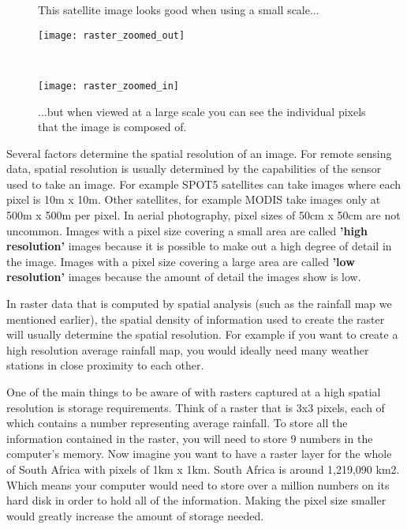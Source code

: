 \begin{figure}[htpb]
   \begin{minipage}[h]{\textwidth}
   \begin{center}
   \caption{This satellite image looks good when using a small scale...}
   \label{fig:smallscale}\smallskip
   \texttt{[image: raster\_zoomed\_out]}
   \end{center}
   \end{minipage} \\
   \vspace{1cm}
   \begin{minipage}[h]{\textwidth}
   \begin{center}
   \caption{...but when viewed at a large scale you can see the individual
pixels that the image is composed of.}
   \label{fig:largescale}\smallskip
   \texttt{[image: raster\_zoomed\_in]}
   \end{center}
   \end{minipage}
\end{figure}

Several factors determine the spatial resolution of an image. For remote
sensing data, spatial resolution is usually determined by the capabilities of
the sensor used to take an image. For example SPOT5 satellites can take
images where each pixel is 10m x 10m. Other satellites, for example MODIS
take images only at 500m x 500m per pixel. In aerial photography, pixel sizes
of 50cm x 50cm are not uncommon. Images with a pixel size covering a small
area are called \textbf{'high resolution'} images because it is possible to
make out a high degree of detail in the image. Images with a pixel size
covering a large area are called \textbf{'low resolution'} images because the
amount of detail the images show is low.

In raster data that is computed by spatial analysis (such as the rainfall map
we mentioned earlier), the spatial density of information used to create the
raster will usually determine the spatial resolution. For example if you want
to create a high resolution average rainfall map, you would ideally need many
weather stations in close proximity to each other.

One of the main things to be aware of with rasters captured at a high spatial
resolution is storage requirements. Think of a raster that is 3x3 pixels,
each of which contains a number representing average rainfall. To store all
the information contained in the raster, you will need to store 9 numbers in
the computer's memory. Now imagine you want to have a raster layer for the
whole of South Africa with pixels of 1km x 1km. South Africa is around
1,219,090 km2. Which means your computer would need to store over a million
numbers on its hard disk in order to hold all of the information. Making the
pixel size smaller would greatly increase the amount of storage needed.

